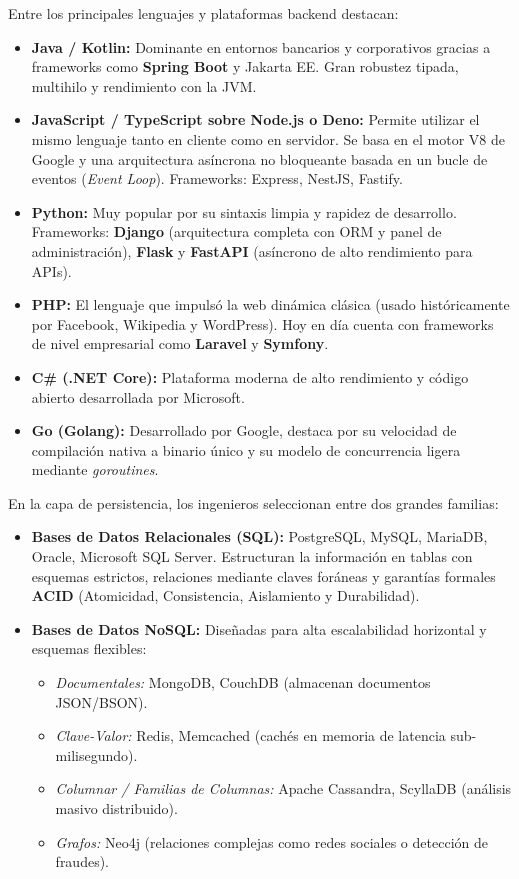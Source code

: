 Entre los principales lenguajes y plataformas backend destacan:
\begin{itemize}[leftmargin=1.2cm]
  \item \textbf{Java / Kotlin:} Dominante en entornos bancarios y corporativos gracias a frameworks como \textbf{Spring Boot} y Jakarta EE. Gran robustez tipada, multihilo y rendimiento con la JVM.
  \item \textbf{JavaScript / TypeScript sobre Node.js o Deno:} Permite utilizar el mismo lenguaje tanto en cliente como en servidor. Se basa en el motor V8 de Google y una arquitectura asíncrona no bloqueante basada en un bucle de eventos (\textit{Event Loop}). Frameworks: Express, NestJS, Fastify.
  \item \textbf{Python:} Muy popular por su sintaxis limpia y rapidez de desarrollo. Frameworks: \textbf{Django} (arquitectura completa con ORM y panel de administración), \textbf{Flask} y \textbf{FastAPI} (asíncrono de alto rendimiento para APIs).
  \item \textbf{PHP:} El lenguaje que impulsó la web dinámica clásica (usado históricamente por Facebook, Wikipedia y WordPress). Hoy en día cuenta con frameworks de nivel empresarial como \textbf{Laravel} y \textbf{Symfony}.
  \item \textbf{C\# (.NET Core):} Plataforma moderna de alto rendimiento y código abierto desarrollada por Microsoft.
  \item \textbf{Go (Golang):} Desarrollado por Google, destaca por su velocidad de compilación nativa a binario único y su modelo de concurrencia ligera mediante \textit{goroutines}.
\end{itemize}

En la capa de persistencia, los ingenieros seleccionan entre dos grandes familias:
\begin{itemize}[leftmargin=1.2cm]
  \item \textbf{Bases de Datos Relacionales (SQL):} PostgreSQL, MySQL, MariaDB, Oracle, Microsoft SQL Server. Estructuran la información en tablas con esquemas estrictos, relaciones mediante claves foráneas y garantías formales \textbf{ACID} (Atomicidad, Consistencia, Aislamiento y Durabilidad).
  \item \textbf{Bases de Datos NoSQL:} Diseñadas para alta escalabilidad horizontal y esquemas flexibles:
    \begin{itemize}
      \item \textit{Documentales:} MongoDB, CouchDB (almacenan documentos JSON/BSON).
      \item \textit{Clave-Valor:} Redis, Memcached (cachés en memoria de latencia sub-milisegundo).
      \item \textit{Columnar / Familias de Columnas:} Apache Cassandra, ScyllaDB (análisis masivo distribuido).
      \item \textit{Grafos:} Neo4j (relaciones complejas como redes sociales o detección de fraudes).
    \end{itemize}
\end{itemize}
